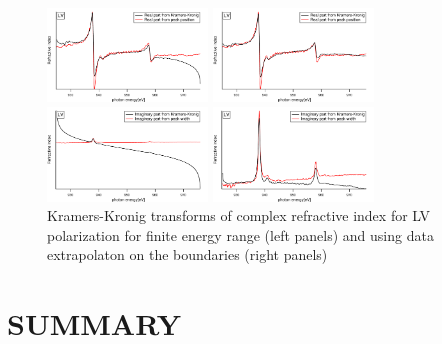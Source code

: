 \documentclass[twocolumn,amsmath,superscriptaddress,amssymb]{revtex4-1}
\begin{document}
\begin{figure}
	\begin{minipage}[t]{0.45\columnwidth}
		\includegraphics[width=\textwidth,height=2.5cm]{./KKT/KKreLV_edge.pdf}
	\end{minipage}
	\begin{minipage}[t]{0.45\columnwidth}
		\includegraphics[width=\textwidth,height=2.5cm]{./KKT/KKreLV.pdf}
	\end{minipage}
	\begin{minipage}[t]{0.45\columnwidth}
		\includegraphics[width=\textwidth,height=2.5cm]{./KKT/KKimLV_edge.pdf}
	\end{minipage}
	\begin{minipage}[t]{0.45\columnwidth}
		\includegraphics[width=\textwidth,height=2.5cm]{./KKT/KKimLV.pdf}
	\end{minipage}
	\caption{\label{KKT} Kramers-Kronig transforms of complex refractive index for LV polarization for finite energy range (left panels) and using data extrapolaton on the boundaries (right panels)}
\end{figure}
%
\section{SUMMARY}
%
%
%
%
\appendix
\end{document}
